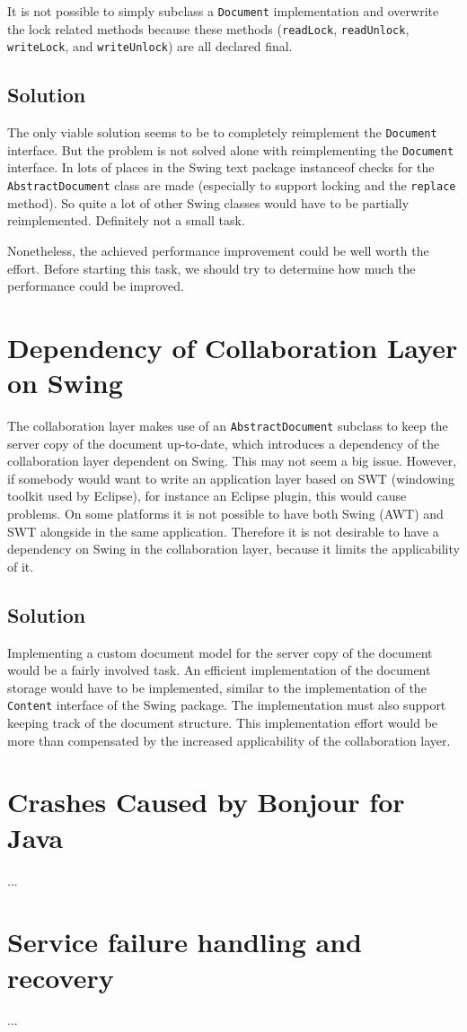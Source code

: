 It is not possible to simply subclass a \texttt{Document}
implementation and overwrite the lock related methods because these
methods (\texttt{read\-Lock}, \texttt{read\-Unlock}, \texttt{write\-Lock},
and \texttt{write\-Unlock}) are all declared final.


\subsection{Solution}
The only viable solution seems to be to completely reimplement the 
\texttt{Document} interface. But the problem is not solved alone with
reimplementing the \texttt{Document} interface. In lots of places in
the Swing text package instanceof checks for the
\texttt{Abstract\-Document} class are made (especially to support locking and
the \texttt{replace} method). So quite a lot of other Swing classes would
have to be partially reimplemented. Definitely not a small task.

Nonetheless, the achieved performance improvement could be well worth the 
effort. Before starting this task, we should try to determine how much
the performance could be improved.



\section{Dependency of Collaboration Layer on Swing}
The collaboration layer makes use of an \texttt{AbstractDocument} subclass to
keep the server copy of the document up-to-date, which introduces a
dependency of the collaboration
layer dependent on Swing. This may not seem a big issue. However, if 
somebody would want to write an application layer based on SWT (windowing
toolkit used by Eclipse), for instance an Eclipse plugin, this would
cause problems. On some platforms it is not possible to have both Swing (AWT)
and SWT alongside in the same application. Therefore it is not desirable
to have a dependency on Swing in the collaboration layer, because it limits
the applicability of it.


\subsection{Solution}
Implementing a custom document model for the server copy of the document
would be a fairly involved task. An efficient implementation of the
document storage would have to be implemented, similar to the implementation
of the \texttt{Content} interface of the Swing package. The implementation
must also support keeping track of the document structure. 
This implementation effort would be more than compensated by the 
increased applicability of the collaboration layer.



\section{Crashes Caused by Bonjour for Java}
...


\section{Service failure handling and recovery}
...
